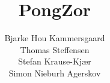 \documentclass[10pt,a4paper]{article}
\title{PongZor}
\author{Bjarke Hou Kammersgaard\\Thomas Steffensen\\Stefan Krause-Kjær\\Simon Nieburh Agerskov}
\begin{document}
\maketitle
\pagebreak

\tableofcontents
\pagebreak






\end{document}
